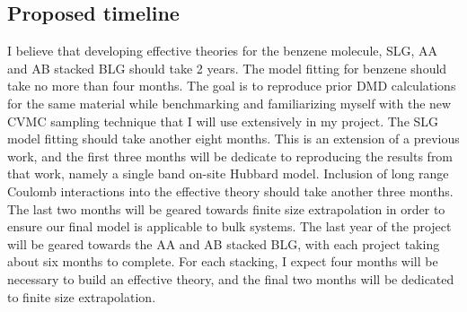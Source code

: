 \documentclass[12pt]{article}
\begin{document}
\subsection{Proposed timeline}
I believe that developing effective theories for the benzene molecule, SLG, AA and AB stacked BLG should take 2 years. 
The model fitting for benzene should take no more than four months.
The goal is to reproduce prior DMD calculations for the same material while benchmarking and familiarizing myself with the new CVMC sampling technique that I will use extensively in my project.
The SLG model fitting should take another eight months.
This is an extension of a previous work, and the first three months will be dedicate to reproducing the results from that work, namely a single band on-site Hubbard model.
Inclusion of long range Coulomb interactions into the effective theory should take another three months.
The last two months will be geared towards finite size extrapolation in order to ensure our final model is applicable to bulk systems.
The last year of the project will be geared towards the AA and AB stacked BLG, with each project taking about six months to complete.
For each stacking, I expect four months will be necessary to build an effective theory, and the final two months will be dedicated to finite size extrapolation.
\end{document}
